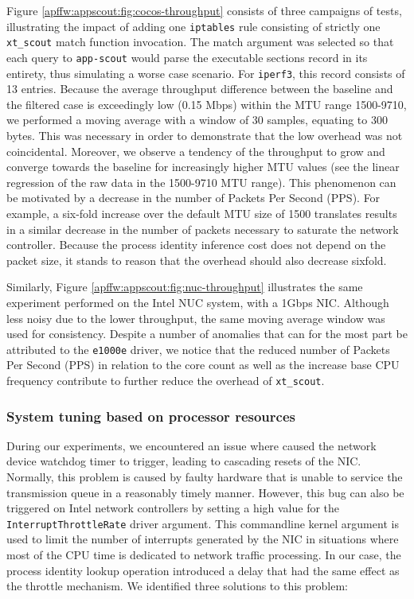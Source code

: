 Figure \ref{apffw:appscout:fig:cocos-throughput} consists of three campaigns of tests, illustrating the impact of adding one \texttt{iptables} rule consisting of strictly one \texttt{xt\_scout} match function invocation. The match argument was selected so that each query to \texttt{app-scout} would parse the executable sections record in its entirety, thus simulating a worse case scenario. For \texttt{iperf3}, this record consists of 13 entries. Because the average throughput difference between the baseline and the filtered case is exceedingly low (0.15 Mbps) within the MTU range 1500-9710, we performed a moving average with a window of 30 samples, equating to 300 bytes. This was necessary in order to demonstrate that the low overhead was not coincidental. Moreover, we observe a tendency of the \scout{} throughput to grow and converge towards the baseline for increasingly higher MTU values (see the linear regression of the raw data in the 1500-9710 MTU range). This phenomenon can be motivated by a decrease in the number of Packets Per Second (PPS). For example, a six-fold increase over the default MTU size of 1500 translates results in a similar decrease in the number of packets necessary to saturate the network controller. Because the process identity inference cost does not depend on the packet size, it stands to reason that the \scout{} overhead should also decrease sixfold.



Similarly, Figure \ref{apffw:appscout:fig:nuc-throughput} illustrates the same experiment performed on the Intel NUC system, with a 1Gbps NIC. Although less noisy due to the lower throughput, the same moving average window was used for consistency. Despite a number of anomalies that can for the most part be attributed to the \texttt{e1000e} driver, we notice that the reduced number of Packets Per Second (PPS) in relation to the core count as well as the increase base CPU frequency contribute to further reduce the overhead of \texttt{xt\_scout}.


\subsubsection{System tuning based on processor resources}
\label{subsec:tuning}

During our experiments, we encountered an issue where \scout{} caused the network device watchdog timer to trigger, leading to cascading resets of the NIC. Normally, this problem is caused by faulty hardware that is unable to service the transmission queue in a reasonably timely manner. However, this bug can also be triggered on Intel network controllers by setting a high value for the \texttt{InterruptThrottleRate} driver argument. This commandline kernel argument is used to limit the number of interrupts generated by the NIC in situations where most of the CPU time is dedicated to network traffic processing. In our case, the process identity lookup operation introduced a delay that had the same effect as the throttle mechanism. We identified three solutions to this problem:

